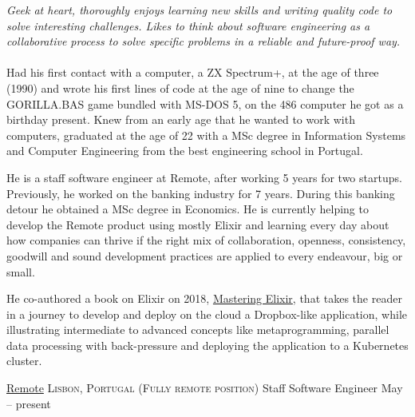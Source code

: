 \documentclass[10pt,a4paper]{article}
\begin{document}
\vspace{-1.3em}  %
\begin{multicols}{2}  %
\noindent \emph{Geek at heart, thoroughly enjoys learning new skills and writing
  quality code to solve interesting challenges. Likes to think about software
  engineering as a collaborative process to solve specific problems in a
  reliable and future-proof way.}
\\
\\
Had his first contact with a computer, a ZX Spectrum+, at the age of three
(1990) and wrote his first lines of code at the age of nine to change the
GORILLA.BAS game bundled with MS-DOS 5, on the 486 computer he got as a
birthday present. Knew from an early age that he wanted to work with computers,
graduated at the age of 22 with a MSc degree in Information Systems and Computer
Engineering from the best engineering school in Portugal.

He is a staff software engineer at Remote, after working 5 years for two startups.
Previously, he worked on the banking industry for 7 years. During
this banking detour he obtained a MSc degree in Economics.
He is currently helping to develop the Remote product using mostly Elixir
and learning every day about how companies can thrive if the right mix
of collaboration, openness, consistency, goodwill and sound development practices
are applied to every endeavour, big or small.

He co-authored a book on Elixir on 2018,
\href{https://www.packtpub.com/application-development/mastering-elixir}{Mastering
Elixir}, that takes the reader in a journey to develop and deploy on the cloud
a Dropbox-like application, while illustrating intermediate to advanced concepts
like metaprogramming, parallel data processing with back-pressure and deploying
the application to a Kubernetes cluster.
\end{multicols}


\spacedhrule{0em}{-0.4em}


\headedsection
  {\href{https://remote.com}{Remote}}
  {\textsc{Lisbon, Portugal (Fully remote position)}} {%
  \headedsubsection
    {Staff Software Engineer}
    {May  -- present}
    {}
}
\end{document}
